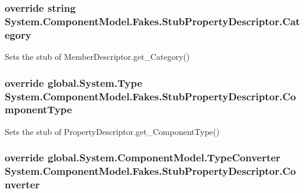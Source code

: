 \hypertarget{class_system_1_1_component_model_1_1_fakes_1_1_stub_property_descriptor_a8adc0cb913f78591db04c589a0d7d7c0}{
\subsubsection[{Category}]{\setlength{\rightskip}{0pt plus 5cm}override string System.\-Component\-Model.\-Fakes.\-Stub\-Property\-Descriptor.\-Category\hspace{0.3cm}{\ttfamily [get]}}}\label{class_system_1_1_component_model_1_1_fakes_1_1_stub_property_descriptor_a8adc0cb913f78591db04c589a0d7d7c0}


Sets the stub of Member\-Descriptor.\-get\-\_\-\-Category()

\hypertarget{class_system_1_1_component_model_1_1_fakes_1_1_stub_property_descriptor_a6dd265982257e42fdb9ef191ee15269c}{
\subsubsection[{Component\-Type}]{\setlength{\rightskip}{0pt plus 5cm}override global.\-System.\-Type System.\-Component\-Model.\-Fakes.\-Stub\-Property\-Descriptor.\-Component\-Type\hspace{0.3cm}{\ttfamily [get]}}}\label{class_system_1_1_component_model_1_1_fakes_1_1_stub_property_descriptor_a6dd265982257e42fdb9ef191ee15269c}


Sets the stub of Property\-Descriptor.\-get\-\_\-\-Component\-Type()

\hypertarget{class_system_1_1_component_model_1_1_fakes_1_1_stub_property_descriptor_acf5a7b949774363233f1ca931755752d}{
\subsubsection[{Converter}]{\setlength{\rightskip}{0pt plus 5cm}override global.\-System.\-Component\-Model.\-Type\-Converter System.\-Component\-Model.\-Fakes.\-Stub\-Property\-Descriptor.\-Converter\hspace{0.3cm}{\ttfamily [get]}}}\label{class_system_1_1_component_model_1_1_fakes_1_1_stub_property_descriptor_acf5a7b949774363233f1ca931755752d}


